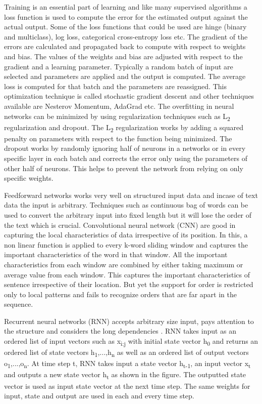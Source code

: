 \documentclass[a4paper, 11pt]{article}
\begin{document}
Training is an essential part of learning and like many supervised algorithms a loss function is used to compute the error for the estimated output against the actual output. Some of the loss functions that could be used are hinge (binary and multiclass), log loss, categorical cross-entropy loss etc. The gradient of the errors are calculated and propagated back to compute with respect to weights and bias. The values of the weights and bias are adjusted with respect to the gradient and a learning parameter. Typically a random batch of input are selected and parameters are applied and the output is computed. The average loss is computed for that batch and the parameters are reassigned. This optimization technique is called stochastic gradient descent \cite{Bottou2012} and other techniques available are Nesterov Momentum, AdaGrad etc. The overfitting in neural networks can be minimized by using regularization techniques such as L\textsubscript{2} regularization and dropout\cite{Hinton2012}. The L\textsubscript{2} regularization works by adding a squared penalty on parameters with respect to the function being minimized. The dropout works by randomly ignoring half of neurons in a networks or in every specific layer in each batch and corrects the error only using the parameters of other half of neurons. This helps to prevent the network from relying on only specific weights. 

Feedforward networks works very well on structured input data and incase of text data the input is arbitrary. Techniques such as continuous bag of words can be used to convert the arbitrary input into fixed length but it will lose the order of the text which is crucial. Convolutional neural network (CNN) \cite{Bengio1997} are good in capturing the local characteristics of data irrespective of its position. In this, a non linear function is applied to every k-word sliding window and captures the important characteristics of the word in that window. All the important characteristics from each window are combined by either taking maximum or average value from each window. This captures the important characteristics of sentence irrespective of their location. But yet the support for order is restricted only to local patterns and fails to recognize orders that are far apart in the sequence.

Recurrent neural networks (RNN) accepts arbitrary size input, pays attention to the structure and considers the long dependencies \cite{Elman}. RNN takes input as an ordered list of input vectors such as x\textsubscript{i:j} with initial state vector h\textsubscript{0} and returns an ordered list of state vectors h\textsubscript{1},...,h\textsubscript{n} as well as an ordered list of output vectors o\textsubscript{1},...,o\textsubscript{n}. At time step t, RNN takes input a state vector h\textsubscript{t-1}, an input vector x\textsubscript{t} and outputs a new state vector h\textsubscript{t} as shown in the figure. The outputted state vector is used as input state vector at the next time step. The same weights for input, state and output are used in each and every time step.  
\end{document}

